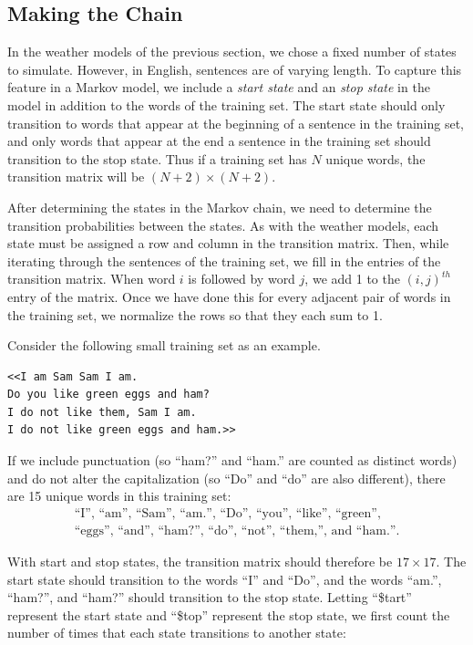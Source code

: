 \subsection*{Making the Chain} %

In the weather models of the previous section, we chose a fixed number of states to simulate.
However, in English, sentences are of varying length.
To capture this feature in a Markov model, we include a \emph{start state} and an \emph{stop state} in the model in addition to the words of the training set.
The start state should only transition to words that appear at the beginning of a sentence in the training set, and only words that appear at the end a sentence in the training set should transition to the stop state.
Thus if a training set has $N$ unique words, the transition matrix will be $(N+2) \times (N+2)$.

After determining the states in the Markov chain, we need to determine the transition probabilities between the states.
As with the weather models, each state must be assigned a row and column in the transition matrix.
Then, while iterating through the sentences of the training set, we fill in the entries of the transition matrix.
When word $i$ is followed by word $j$, we add 1 to the $(i,j)^{th}$ entry of the matrix.
Once we have done this for every adjacent pair of words in the training set, we normalize the rows so that they each sum to 1.

Consider the following small training set as an example.

\begin{lstlisting}
<<I am Sam Sam I am.
Do you like green eggs and ham?
I do not like them, Sam I am.
I do not like green eggs and ham.>>
\end{lstlisting}

If we include punctuation (so ``ham?'' and ``ham.'' are counted as distinct words) and do not alter the capitalization (so ``Do'' and ``do'' are also different), there are 15 unique words in this training set:
\begin{align*}
\text{``I'', ``am'', ``Sam'', ``am.'', ``Do'', ``you'', ``like'', ``green'',}
\\
\text{``eggs'', ``and'', ``ham?'', ``do'', ``not'', ``them,'', and ``ham.''.}
\end{align*}

With start and stop states, the transition matrix should therefore be $17 \times 17$.
The start state should transition to the words ``I'' and ``Do'', and the words ``am.'', ``ham?'', and ``ham?'' should transition to the stop state.
Letting ``{\color[rgb]{0,.6,0}\$tart}'' represent the start state and ``{\color{red}\$top}'' represent the stop state, we first count the number of times that each state transitions to another state:


